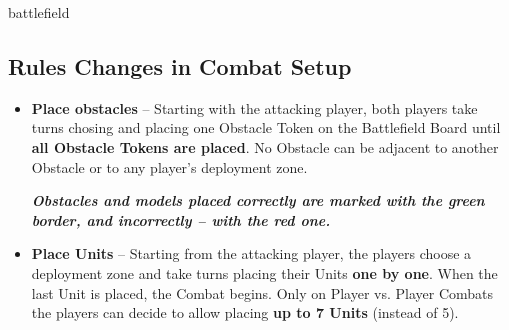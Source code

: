 \begin{expansion}{battlefield}
\begin{multicols*}{2}
  \subsection*{Rules Changes in Combat Setup}
  \begin{itemize}
    \item \textbf{Place obstacles} – Starting with the attacking player, both players take turns chosing and placing one Obstacle Token on the Battlefield Board until \textbf{all Obstacle Tokens are placed}. No Obstacle can be adjacent to another Obstacle or to any player's deployment zone.

    {\footnotesize\textbf{\textit{\textcolor{darkcandyapplered}{Obstacles and models placed correctly are marked with the green border, and incorrectly -- with the red one.}}}}
    \item \textbf{Place Units} – Starting from the attacking player, the players choose a deployment zone and take turns placing their Units \textbf{one by one}.
    When the last Unit is placed, the Combat begins.
    Only on Player vs. Player Combats the players can decide to allow placing \textbf{up to 7 Units} (instead of 5).
  \end{itemize}
  \end{multicols*}
\end{expansion}

